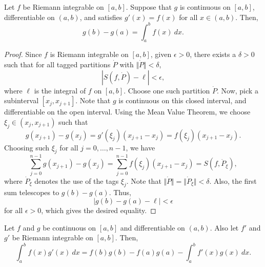 \documentclass[11pt]{article}
\theoremstyle{definition}
\theoremstyle{remark}
\numberwithin{equation}{module}
\begin{document}
    \begin{theorem}
        Let $f$ be Riemann integrable on $[a, b]$. Suppose that $g$ is continuous on
        $[a, b]$, differentiable on $(a, b)$, and satisfies $g'(x) = f(x)$ for all
        $x \in (a, b)$. Then, \[
            g(b) - g(a) = \int_a^b f(x)\:dx.
        \] 
    \end{theorem}
    \begin{proof}
        Since $f$ is Riemann integrable on $[a, b]$, given $\epsilon > 0$, there
        exists a $\delta > 0$ such that for all tagged partitions $\dot{P}$ with
        $\Vert\dot{P}\Vert < \delta$, \[
            |S(f, \dot{P}) - \ell| < \epsilon,
        \] where $\ell$ is the integral of $f$ on $[a, b]$. Choose one such
        partition $\dot{P}$. Now, pick a subinterval $[x_j, x_{j + 1}]$. Note that
        $g$ is continuous on this closed interval, and differentiable on the open
        interval. Using the Mean Value Theorem, we choose $\xi_j \in (x_j, x_{j +
        1})$ such that \[
            g(x_{j + 1}) - g(x_j) = g'(\xi_j)(x_{j + 1} - x_j) = f(\xi_j)(x_{j + 1}
            - x_j).
        \] Choosing such $\xi_j$ for all $j = 0, \dots, n - 1$, we have \[
            \sum_{j = 0}^{n - 1}g(x_{j + 1}) - g(x_j) = \sum_{j = 0}^{n - 1}
            f(\xi_j)(x_{j + 1} - x_j) = S(f, \dot{P}_\xi),
        \] where $\dot{P}_\xi$ denotes the use of the tags $\xi_j$. Note that
        $\Vert\dot{P}\Vert = \Vert\dot{P}_\xi\Vert < \delta$. Also, the first sum
        telescopes to $g(b) - g(a)$. Thus, \[
            |g(b) - g(a) - \ell| < \epsilon
        \] for all $\epsilon > 0$, which gives the desired equality.
    \end{proof}

    \begin{theorem}
        Let $f$ and $g$ be continuous on $[a, b]$ and differentiable on $(a, b)$.
        Also let $f'$ and $g'$ be Riemann integrable on $[a, b]$. Then, \[
            \int_a^b f(x)g'(x)\:dx = f(b)g(b) - f(a)g(a) - \int_a^b f'(x)g(x)\:dx.
        \] 
    \end{theorem}
\end{document}
